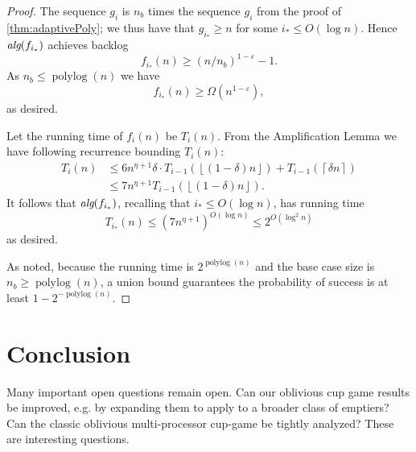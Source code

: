 \documentclass[twocolumn]{article}[10pt]
\DeclareMathOperator{\polylog}{\text{polylog}}
\newcommand{\alg}[1]{\textit{\text{alg}}({#1})}
\newcommand{\floor}[1]{\left\lfloor #1 \right\rfloor}
\newcommand{\ceil}[1]{\left\lceil #1 \right\rceil}
\begin{document}
\begin{proof}
  The sequence $g_i$ is $n_b$ times the sequence $g_i$ from
  the proof of \cref{thm:adaptivePoly}; we thus have that $g_{i_*}
  \ge n$ for some $i_* \le O(\log n)$.
  Hence $\alg{f_{i_*}}$ achieves backlog 
  $$f_{i_*}(n) \ge (n/n_b)^{1-\varepsilon}-1.$$
  As $n_b \le \polylog(n)$ we have
  $$f_{i_*}(n) \ge \Omega(n^{1-\varepsilon}),$$ as desired.

  Let the running time of $f_i(n)$ be $T_i(n)$. From the Amplification Lemma we have following recurrence bounding $T_i(n)$:
  \begin{align*}
    T_i(n) &\le 6n^{\eta+1} \delta \cdot T_{i-1}(\floor{(1-\delta)n}) +
  T_{i-1}(\ceil{\delta n}) \\
  &\le 7n^{\eta+1}T_{i-1}(\floor{(1-\delta)n}).
  \end{align*}
  It follows that $\alg{f_{i_*}}$, recalling that $i_* \le O(\log n)$, has running time
  $$T_{i_*}(n) \le (7n^{\eta+1})^{O(\log n)} \le 2^{O(\log^2 n)}$$
  as desired.

  As noted, because the running time is $2^{\polylog(n)}$ and the
  base case size is $n_b\ge \polylog(n)$, a union bound
  guarantees the probability of success is at least
  $1-2^{-\polylog(n)}$.
\end{proof}


\section{Conclusion}
Many important open questions remain open. Can our oblivious cup game results
be improved, e.g. by expanding them to apply to a broader class of emptiers?
Can the classic oblivious multi-processor cup-game be tightly analyzed?
These are interesting questions.



\end{document}
